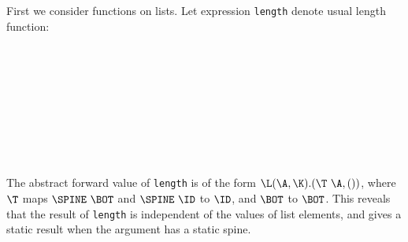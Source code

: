 First we consider functions on lists.
Let expression \mbox{\tt length} denote usual length function:
\theisrr
\begin{flushleft}
\vspace{-0.0em}\vspace{-0.0em}\\
\vspace{-0.0em}\\
\vspace{-0.0em}\\
\vspace{-0.0em}
\end{flushleft}
\else
\begin{flushleft}
\vspace{-0.0em}\vspace{-0.0em}\\
\vspace{-0.0em}\\
\vspace{-0.0em}\\
\vspace{-0.0em}\\
\vspace{-0.0em}
\end{flushleft}
\fi
The abstract forward value of \mbox{\tt length} is of the form
$\L(\A,\K).(\T~\A,())$, where $\T$ maps $\SPINE~\BOT$ and $\SPINE~\ID$
to $\ID$, and $\BOT$ to $\BOT$.  This reveals that the result of
\mbox{\tt length} is independent of the values of list elements, and gives
a static result when the argument has a static spine.


